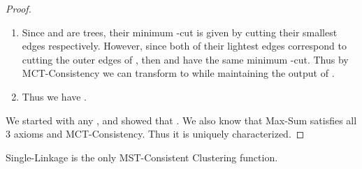 \documentclass[twoside,11pt]{article}
\begin{document}
\begin{proof}
\begin{enumerate}
\item Since  and  are trees, their minimum -cut is given by cutting their  smallest edges respectively.
However, since both of their  lightest edges correspond to cutting the outer edges of , then  and  have the same minimum -cut. Thus
by MCT-Consistency we can transform  to  while maintaining the output of .
	\item Thus we have .
\end{enumerate}
We started with any , and showed that .
We also know that Max-Sum satisfies all 3 axioms and MCT-Consistency. Thus
it is uniquely characterized.
\end{proof}

\begin{theorem} \label{mainsl}
Single-Linkage is the only MST-Consistent Clustering function.
\end{theorem}
\end{document}
